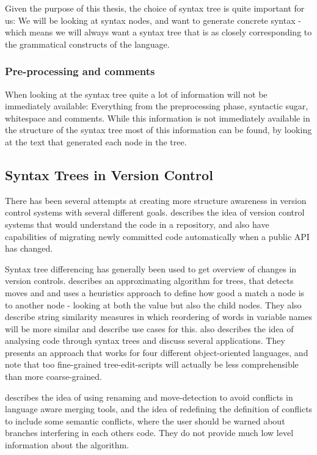 \documentclass[11pt]{article}
\begin{document}
Given the purpose of this thesis, the choice of syntax tree is quite important for us: We will be looking at syntax nodes, and want to generate concrete syntax - which means we will always want a syntax tree that is as closely corresponding to the grammatical constructs of the language.

\subsubsection{Pre-processing and comments}
When looking at the syntax tree quite a lot of information will not be immediately available: Everything from the preprocessing phase, syntactic sugar, whitespace and comments. While this information is not immediately available in the structure of the syntax tree most of this information can be found, by looking at the text that generated each node in the tree. 

\subsection{Syntax Trees in Version Control}
There has been several attempts at creating more structure awareness in version control systems with several different goals. \citet{Freese} describes the idea of version control systems that would understand the code in a repository, and also have capabilities of migrating newly committed code automatically when a public API has changed.

Syntax tree differencing has generally been used to get overview of changes in version controls. \citet{Fluri} describes an approximating algorithm for trees, that  detects moves and and uses a heuristics approach to define how good a match a node is to another node - looking at both the value but also the child nodes. They also describe string similarity measures in which reordering of words in variable names will be more similar and describe use cases for this. \citet{Hashimoto} also describes the idea of analysing code through syntax trees and discuss several applications. They presents an approach that works for four different object-oriented languages, and note that too fine-grained tree-edit-scripts will actually be less comprehensible than more coarse-grained.

\citet{Hunt} describes the idea of using renaming and move-detection to avoid conflicts in language aware merging tools, and the idea of redefining the definition of conflicts to include some semantic conflicts, where the user should be warned about branches interfering in each others code. They do not provide much low level information about the algorithm.
\end{document}
